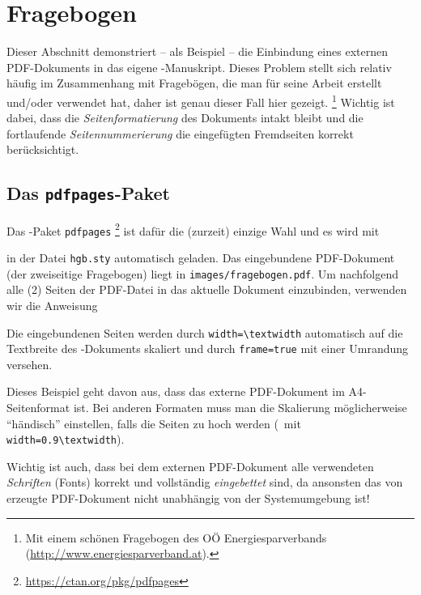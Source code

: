 \chapter{Fragebogen}
\label{app:Fragebogen}


Dieser Abschnitt demonstriert -- als Beispiel -- die Einbindung eines externen PDF-Dokuments
in das eigene \latex-Manuskript.
Dieses Problem stellt sich relativ häufig im Zusammenhang mit Fragebögen, die
man für seine Arbeit erstellt und/oder verwendet hat, daher ist genau dieser Fall hier gezeigt.%
\footnote{Mit einem schönen Fragebogen des OÖ Energiesparverbands (\url{http://www.energiesparverband.at}).}
Wichtig ist dabei, dass die \emph{Seitenformatierung} des Dokuments intakt bleibt 
und die fortlaufende \emph{Seitennummerierung} die eingefügten Fremdseiten korrekt berücksichtigt.

\section{Das \texttt{pdfpages}-Paket}

Das \latex-Paket \texttt{pdfpages}%
\footnote{\url{https://ctan.org/pkg/pdfpages}}
ist dafür die (zurzeit) einzige Wahl und es wird mit 
%
\begin{LaTeXCode}[numbers=none]
\RequirePackage{pdfpages}
\end{LaTeXCode}
%
in der Datei \nolinkurl{hgb.sty} automatisch geladen.
Das eingebundene PDF-Dokument (der zweiseitige Frage\-bogen) liegt in
\nolinkurl{images/fragebogen.pdf}.
Um nachfolgend alle (2) Seiten der PDF-Datei in das aktuelle Dokument einzubinden,
verwenden wir die Anweisung  
%
\begin{LaTeXCode}[numbers=none]

\end{LaTeXCode}
%
Die eingebundenen Seiten werden durch \verb!width=\textwidth! automatisch auf die Textbreite
des \latex-Dokuments skaliert und durch \verb!frame=true! mit einer Umrandung versehen.

Dieses Beispiel geht davon aus, dass das externe PDF-Dokument im A4-Seitenformat ist.
Bei anderen Formaten muss man die Skalierung möglicherweise "`händisch"' einstellen,
falls die Seiten zu hoch werden (\zB\ mit \verb!width=0.9\textwidth!).

Wichtig ist auch, dass bei dem externen PDF-Dokument alle verwendeten \emph{Schriften}
(Fonts) korrekt und vollständig \emph{eingebettet} sind, da ansonsten das von \latex erzeugte 
PDF-Dokument nicht unabhängig von der Systemumgebung ist!


